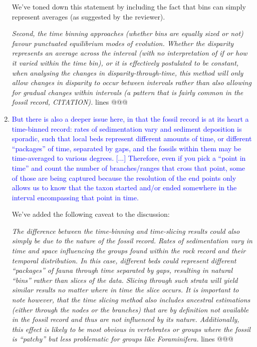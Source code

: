 \documentclass[12pt,letterpaper]{article}
\begin{document}
\begin{enumerate}
We've toned down this statement by including the fact that bins can simply represent averages (as suggested by the reviewer).

\textit{Second, the time binning approaches (whether bins are equally sized or not) favour punctuated equilibrium modes of evolution.
Whether the disparity represents an average across the interval (with no interpretation of if or how it varied within the time bin), or it is effectively postulated to be constant, when analysing the changes in disparity-through-time, this method will only allow changes in disparity to occur between intervals rather than also allowing for gradual changes within intervals (a pattern that is fairly common in the fossil record, CITATION).} lines @@@


\item{\textcolor{blue}{But there is also a deeper issue here, in that the fossil record is at its heart a time-binned record: rates of sedimentation vary and sediment deposition is sporadic, such that local beds represent different amounts of time, or different ``packages'' of time, separated by gaps, and the fossils within them may be time-averaged to various degrees. [...] Therefore, even if you pick a ``point in time'' and count the number of branches/ranges that cross that point, some of those are being captured because the resolution of the end points only allows us to know that the taxon started and/or ended somewhere in the interval encompassing that point in time.}}

We've added the following caveat to the discussion:

\textit{The difference between the time-binning and time-slicing results could also simply be due to the nature of the fossil record.
Rates of sedimentation vary in time and space influencing the groups found within the rock record and their temporal distribution. 
In this case, different beds could represent different ``packages'' of fauna through time separated by gaps, resulting in natural ``bins'' rather than slices of the data.
Slicing through such strata will yield similar results no matter where in time the slice occurs.
It is important to note however, that the time slicing method also includes ancestral estimations (either through the nodes or the branches) that are by definition not available in the fossil record and thus are not influenced by its nature.
Additionally, this effect is likely to be most obvious in vertebrates or groups where the fossil is ``patchy'' but less problematic for groups like Foraminifera.} lines @@@


\end{enumerate}
\end{document}
